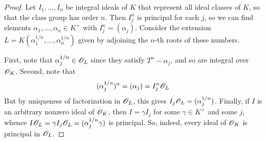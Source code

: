 \begin{proof}
	Let $I_1,\ldots,I_n$ be integral ideals of $K$ that represent all ideal classes of $K$, so that the class group has order $n$. Then $I_j^n$ is principal for each $j$, so we can find elements $\alpha_1,\ldots,\alpha_n \in K^\times$ with $I_j^n = (\alpha_j)$. Consider the extension $L = K(\alpha_1^{1/n},\ldots,\alpha_n^{1/n})$ given by adjoining the $n$-th roots of these numbers.
	
	First, note that $\alpha_j^{1/n} \in \mathscr{O}_L$ since they satisfy $T^n - \alpha_j$, and so are integral over $\mathscr{O}_K$. Second, note that
	\[ (\alpha_j^{1/n})^n = (\alpha_j) = I_j^n\mathscr{O}_L \]
	But by uniqueness of factorization in $\mathscr{O}_L$, this gives $I_j\mathscr{O}_L = (\alpha_j^{1/n})$. Finally, if $I$ is an arbitrary nonzero ideal of $\mathscr{O}_K$, then $I = \gamma I_j$ for some $\gamma \in K^\times$ and some $j$, whence $I\mathscr{O}_L = \gamma I_j\mathscr{O}_L = (\alpha_j^{1/n}\gamma)$ is principal. So, indeed, every ideal of $\mathscr{O}_K$ is principal in $\mathscr{O}_L$.
\end{proof}
